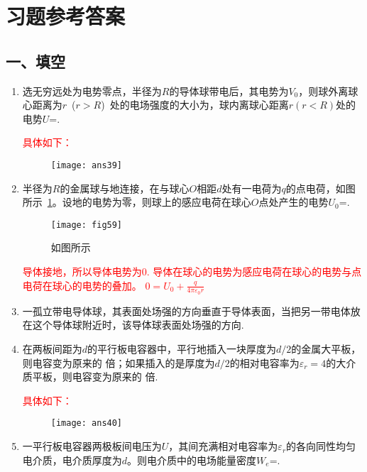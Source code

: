 \section{习题参考答案}
\subsection*{一、填空}
\begin{enumerate}
    \item 选无穷远处为电势零点，半径为$R$的导体球带电后，其电势为$V_0$，则球外离球心距离为$r$~($r>R$)~处的电场强度的大小为，球内离球心距离$r(r<R)$处的电势$U$=.
    \begin{note}
        \textcolor{red}{具体如下：}
        \begin{figure}[H]
            \centering
            \texttt{[image: ans39]}
        \end{figure}
    \end{note}
    \item 半径为$R$的金属球与地连接，在与球心$O$相距$d$处有一电荷为$q$的点电荷，如图所示~\ref{Fig:59}。设地的电势为零，则球上的感应电荷在球心$O$点处产生的电势$U_0$=.    
    \begin{figure}[H]
        \centering
        \texttt{[image: fig59]}
        \caption{如图所示}\label{Fig:59}
    \end{figure}
    \begin{note}
        \textcolor{red}{导体接地，所以导体电势为0. 导体在球心的电势为感应电荷在球心的电势与点电荷在球心的电势的叠加。 $0=U_0+\frac{q}{4\pi \varepsilon_0 r}$
        }
    \end{note}
    \item 一孤立带电导体球，其表面处场强的方向垂直于导体表面，当把另一带电体放在这个导体球附近时，该导体球表面处场强的方向.
    \item 在两板间距为$d$的平行板电容器中，平行地插入一块厚度为$d/2$的金属大平板，则电容变为原来的 倍；如果插入的是厚度为$d/2$的相对电容率为$\varepsilon_r = 4$的大介质平板，则电容变为原来的 倍.
    \begin{note}
        \textcolor{red}{具体如下：}
        \begin{figure}[H]
            \centering
            \texttt{[image: ans40]}
        \end{figure}
    \end{note}
    \item 一平行板电容器两极板间电压为$U$，其间充满相对电容率为$\varepsilon_r$的各向同性均匀电介质，电介质厚度为$d$。则电介质中的电场能量密度$W_e$=.

\end{enumerate}
